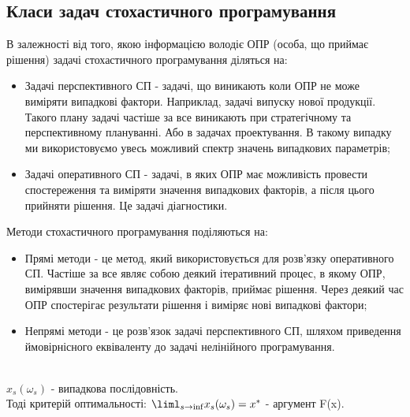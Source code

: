 \subsection{Класи задач стохастичного програмування}
В залежності від того, якою інформацією володіє ОПР (особа, що приймає рішення) задачі стохастичного програмування діляться на:
\begin{itemize}
\item Задачі перспективного СП - задачі, що виникають коли ОПР не може виміряти випадкові фактори. Наприклад, задачі випуску нової продукції. Такого плану задачі частіше за все виникають при стратегічному та перспективному плануванні. Або в задачах проектування. В такому випадку ми використовуємо увесь можливий спектр значень випадкових параметрів;
\item Задачі оперативного СП - задачі, в яких ОПР має можливість провести спостереження та виміряти значення випадкових факторів, а після цього прийняти рішення. Це задачі діагностики.
\end{itemize}
Методи стохастичного програмування поділяються на:
\begin{itemize}
\item Прямі методи - це метод, який використовується для розв’язку оперативного СП. Частіше за все являє собою деякий ітеративний процес, в якому ОПР, вимірявши значення випадкових факторів, приймає рішення. Через деякий час ОПР спостерігає результати рішення і виміряє нові випадкові фактори;
\item Непрямі методи - це розв’язок задачі перспективного СП, шляхом приведення ймовірнісного еквіваленту до задачі нелінійного програмування.
\end{itemize}
\begin{exs}
 \\
$x_s(\omega_s)$ - випадкова послідовність.\\
Тоді критерій оптимальності: $\liml_{s\to\inf}x_s(\omega_s)=x^*$ - аргумент F(x).
\end{exs}
